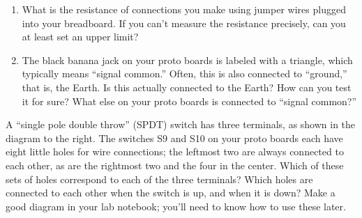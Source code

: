 \begin{enumerate}[wide]
\item What is the resistance of connections you make using jumper wires plugged into your breadboard.  If you can't measure the resistance precisely, can you at least set an upper limit?

\item The black banana jack on your proto boards is labeled with a triangle, which typically means ``signal common.'' Often, this is also connected to ``ground,'' that is, the Earth.  Is this actually connected to the Earth?  How can you test it for sure?  What else on your proto boards is connected to ``signal common?''

\end{enumerate}
\begin{enumerate}


\begin{minipage}{.75\textwidth}

\item A ``single pole double throw'' (SPDT) switch has three terminals, as shown in the diagram to the right.  The switches S9 and S10 on your proto boards each have eight little holes for wire connections; the leftmost two are always connected to each other, as are the rightmost two and the four in the center.  Which of these sets of holes correspond to each of the three terminals?  Which holes are connected to each other when the switch is up, and when it is down?  Make a good diagram in your lab notebook; you'll need to know how to use these later.\label{part_switches}
\end{minipage}
\begin{minipage}{.24\textwidth}
\end{minipage}


\end{enumerate}
